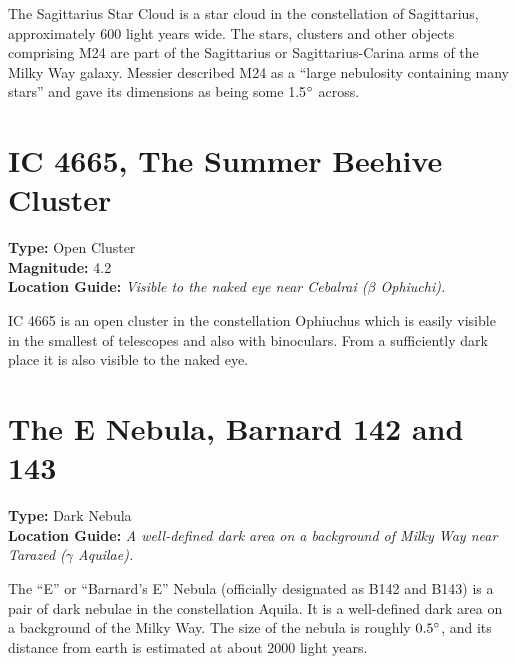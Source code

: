 The Sagittarius Star Cloud is a star cloud in the constellation of
Sagittarius, approximately 600 light years wide. The stars, clusters
and other objects comprising M24 are part of the Sagittarius or
Sagittarius-Carina arms of the Milky Way galaxy. Messier described M24
as a ``large nebulosity containing many stars'' and gave its
dimensions as being some 1.5$\degree$ across.

\section{IC 4665, The Summer Beehive Cluster}
\textbf{Type:} Open Cluster \\
\textbf{Magnitude:} 4.2 \\ 
\textbf{Location Guide:} \textit{Visible to the naked eye near Cebalrai ($\beta$ Ophiuchi).}

IC 4665 is an open cluster in the constellation Ophiuchus which is
easily visible in the smallest of telescopes and also with
binoculars. From a sufficiently dark place it is also visible to the
naked eye.

\section{The E Nebula, Barnard 142 and 143}
\textbf{Type:} Dark Nebula \\
\textbf{Location Guide:} \textit{A well-defined dark area on a background of Milky Way near Tarazed ($\gamma$ Aquilae).}

The ``E'' or ``Barnard's E'' Nebula (officially designated as B142 and
B143) is a pair of dark nebulae in the constellation Aquila. It is a
well-defined dark area on a background of the Milky Way. The size of the
nebula is roughly $0.5\degree$, and its distance from earth is
estimated at about 2000 light years.

